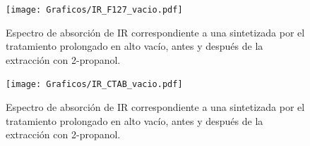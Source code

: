          \begin{figure}[!ht]
			 	\begin{center}
			 	\texttt{[image: Graficos/IR\_F127\_vacio.pdf]}
			 	\caption[FTIR \pdmF\space tratamiento prolongado.]{Espectro de absorción de IR correspondiente a una \pdmF\space sintetizada por el tratamiento prolongado en alto vacío, antes y después de la extracción con 2-propanol.}
			 	\label{fig:IR_F127_vacio}
			 	\end{center}
			 	\end{figure}
						
		 \begin{figure}[!ht]
			 	\begin{center}
			 	\texttt{[image: Graficos/IR\_CTAB\_vacio.pdf]}
			 	\caption[FTIR \pdmC\space tratamiento prolongado.]{Espectro de absorción de IR correspondiente a una \pdmC\space sintetizada por el tratamiento prolongado en alto vacío, antes y después de la extracción con 2-propanol.}
			 	\label{fig:IR_CTAB_vacio}
			 	\end{center}
			 	\end{figure}

\let\thispagestyle=\originalstyle